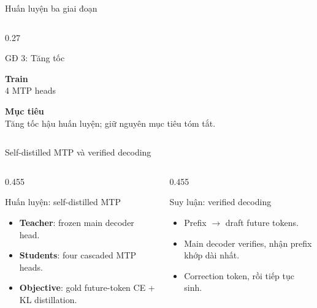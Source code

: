 \documentclass[aspectratio=169,11pt]{beamer}
\begin{document}
\begin{frame}{Huấn luyện ba giai đoạn}
\begin{columns}[c,onlytextwidth]
\begin{column}{0.27\textwidth}
\begin{exampleblock}{GĐ 3: Tăng tốc}
\begin{minipage}[t][3.6cm][t]{\linewidth}
        \vspace{0.35em}
        \textbf{Train}\\
        4 MTP heads

        \vspace{0.35em}
        \textbf{Mục tiêu}\\
        Tăng tốc hậu huấn luyện; giữ nguyên mục tiêu tóm tắt.
        \end{minipage}
      \end{exampleblock}
    \end{column}
  \end{columns}
\end{frame}

\begin{frame}{Self-distilled MTP và verified decoding}
  \begin{columns}[T,onlytextwidth]
    \begin{column}{0.455\textwidth}
      \begin{block}{Huấn luyện: self-distilled MTP}
        \begin{minipage}[t][2.1cm][t]{\linewidth}
        \footnotesize
        \begin{itemize}
          \setlength{\itemsep}{0.1em}
          \item \textbf{Teacher}: frozen main decoder head.
          \item \textbf{Students}: four cascaded MTP heads.
          \item \textbf{Objective}: gold future-token CE + KL distillation.
        \end{itemize}
        \end{minipage}
      \end{block}
    \end{column}
    \hfill
    \begin{column}{0.455\textwidth}
      \begin{block}{Suy luận: verified decoding}
        \begin{minipage}[t][2.1cm][t]{\linewidth}
        \footnotesize
        \begin{itemize}
          \setlength{\itemsep}{0.1em}
          \item Prefix $\rightarrow$ draft future tokens.
          \item Main decoder verifies, nhận prefix khớp dài nhất.
          \item Correction token, rồi tiếp tục sinh.
        \end{itemize}
        \end{minipage}
      \end{block}
    \end{column}
  \end{columns}


\end{frame}
\end{document}
